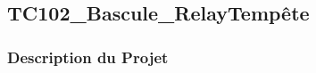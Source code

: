 \documentclass[a4paper,12pt]{report}
\begin{document}
\newpage
\subsection{TC102\_Bascule\_RelayTempête}
\begin{center}
\label{}
\end{center}
\subsubsection{Description du Projet}
\end{document}
